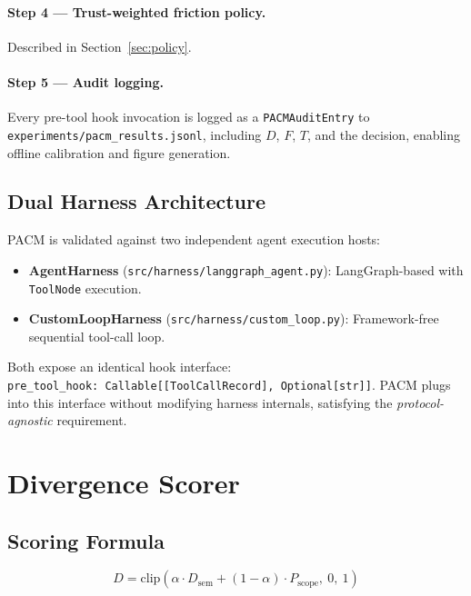 \documentclass[11pt,letterpaper]{article}
\newcommand{\pacm}{\textsc{PACM}}
\begin{document}
\paragraph{Step 4 --- Trust-weighted friction policy.}
Described in Section~\ref{sec:policy}.

\paragraph{Step 5 --- Audit logging.}
Every pre-tool hook invocation is logged as a \texttt{PACMAuditEntry} to
\texttt{experiments/pacm\_results.jsonl}, including $D$, $F$, $T$, and the
decision, enabling offline calibration and figure generation.

\subsection{Dual Harness Architecture}

\pacm{} is validated against two independent agent execution hosts:
\begin{itemize}
  \item \textbf{AgentHarness} (\texttt{src/harness/langgraph\_agent.py}):
    LangGraph-based with \texttt{ToolNode} execution.
  \item \textbf{CustomLoopHarness} (\texttt{src/harness/custom\_loop.py}):
    Framework-free sequential tool-call loop.
\end{itemize}

Both expose an identical hook interface:
\texttt{pre\_tool\_hook:~Callable[[ToolCallRecord],~Optional[str]]}.
\pacm{} plugs into this interface without modifying harness internals,
satisfying the \emph{protocol-agnostic} requirement.

\section{Divergence Scorer}
\label{sec:scoring}

\subsection{Scoring Formula}

\begin{equation}
  D = \mathrm{clip}\!\left(\alpha \cdot D_{\mathrm{sem}} + (1-\alpha)
      \cdot P_{\mathrm{scope}},\ 0,\ 1\right)
  \label{eq:divergence}
\end{equation}
\end{document}
